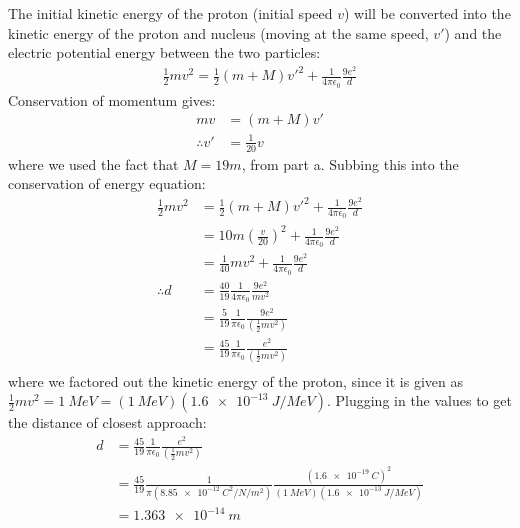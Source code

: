 \begin{solution}
\begin{parts}
The initial kinetic energy of the proton (initial speed $v$) will be converted into the kinetic energy of the proton and nucleus (moving at the same speed, $v'$) and the electric potential energy between the two particles:
\begin{align*}
\frac{1}{2}mv^2=\frac{1}{2}(m+M)v'^2+\frac{1}{4\pi\epsilon_0}\frac{9e^2}{d}
\end{align*}
Conservation of momentum gives:
\begin{align*}
mv &= (m+M)v'\\
\therefore v'&=\frac{1}{20}v
\end{align*}
where we used the fact that $M=19m$, from part a. Subbing this into the conservation of energy equation:
\begin{align*}
\frac{1}{2}mv^2&=\frac{1}{2}(m+M)v'^2+\frac{1}{4\pi\epsilon_0}\frac{9e^2}{d}\\
&=10m\left(\frac{v}{20}\right)^2+\frac{1}{4\pi\epsilon_0}\frac{9e^2}{d}\\
&=\frac{1}{40}mv^2+\frac{1}{4\pi\epsilon_0}\frac{9e^2}{d}\\
\therefore d&= \frac{40}{19}\frac{1}{4\pi\epsilon_0}\frac{9e^2}{mv^2}\\
&= \frac{5}{19}\frac{1}{\pi\epsilon_0}\frac{9e^2}{\left(\frac{1}{2}mv^2\right)}\\
&=\frac{45}{19}\frac{1}{\pi\epsilon_0}\frac{e^2}{\left(\frac{1}{2}mv^2\right)}\\
\end{align*}
where we factored out the kinetic energy of the proton, since it is given as $\frac{1}{2}mv^2=\SI{1}{MeV}=(\SI{1}{MeV})(\SI{1.6e-13}{J/MeV})$. Plugging in the values to get the distance of closest approach:
\begin{align*}
d&=\frac{45}{19}\frac{1}{\pi\epsilon_0}\frac{e^2}{\left(\frac{1}{2}mv^2\right)}\\
&=\frac{45}{19}\frac{1}{\pi(\SI{8.85e-12}{C^2/N/m^2})}\frac{(\SI{1.6e-19}{C})^2}{(\SI{1}{MeV})(\SI{1.6e-13}{J/MeV})}\\
&=\SI{1.363e-14}{m}
\end{align*}
\end{parts}
\end{solution}

